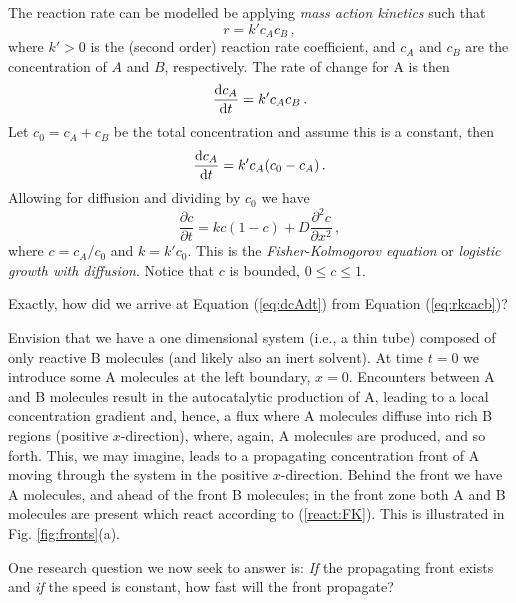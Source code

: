 The reaction rate can be modelled be applying \emph{mass action kinetics}  such that
\begin{equation}
	\label{eq:rkcacb}
  r = k'c_Ac_B \, ,
\end{equation}
where $k'>0$ is the (second order) reaction rate coefficient, and $c_A$ and $c_B$ are the
concentration of $A$ and $B$, respectively. The rate of change for A is then
\begin{equation}
\label{eq:dcAdt}
  \frac{\mathrm{d} c_A}{\mathrm{d} t} = k'c_Ac_B \, .
\end{equation}
Let $c_0=c_A+c_B$ be the total concentration and assume this is a constant, then
\begin{equation}
  \frac{\mathrm{d} c_A}{\mathrm{d} t} = k'c_A(c_0 - c_A) \, .
\end{equation}
Allowing for diffusion and dividing by $c_0$ we have 
\begin{equation}
\frac{\partial c}{\partial t} = kc(1-c) + D \frac{\partial^2c}{\partial x^2}  \, ,
\end{equation}
where $c=c_A/c_0$ and $k=k'c_0$. This is the \emph{Fisher-Kolmogorov equation}
 or 
\emph{logistic growth with diffusion}. Notice that $c$ is bounded, $0 \leq c \leq 1$.

\begin{question}
	Exactly, how did we arrive at Equation (\ref{eq:dcAdt}) from Equation (\ref{eq:rkcacb})?
\end{question}


Envision that we have a one dimensional system (i.e., a thin tube) 
composed of only reactive B molecules (and likely also an inert solvent). At time $t=0$
we introduce some A molecules at the left boundary, $x=0$. Encounters between A and B
molecules result in the autocatalytic production of A, leading to a local concentration
gradient and, hence, a flux where A molecules diffuse into rich B regions (positive $x$-direction),
where, again, A molecules are produced, and so forth. This, we may imagine,
leads to a propagating concentration front of A moving through the
system in the positive $x$-direction. Behind the front we have A molecules, and ahead of the front B
molecules; in the front zone both A and B molecules are present which react
according to (\ref{react:FK}). This is illustrated in Fig. \ref{fig:fronts}(a). 

One research question we now seek to answer is: \emph{If} the propagating front exists
and \emph{if} the speed is constant, how fast will the front propagate?

